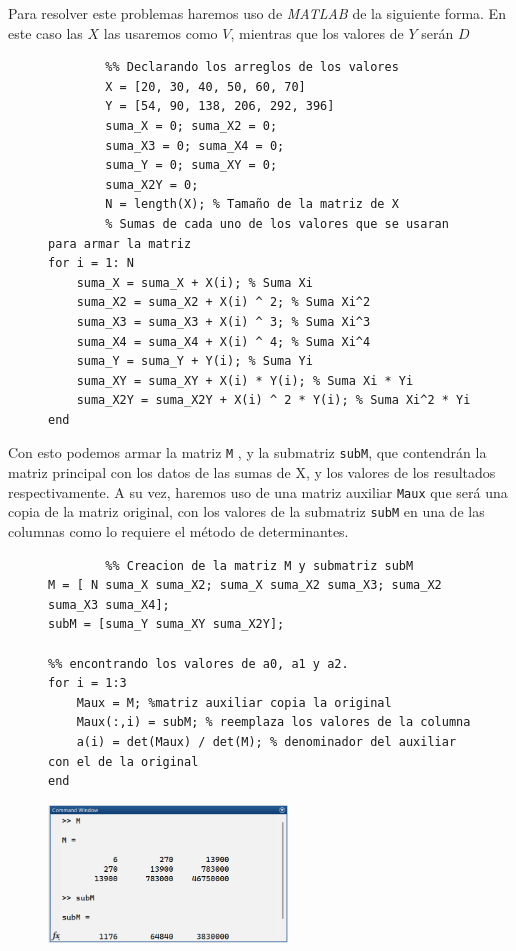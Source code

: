 \documentclass[11pt,letterpaper]{article}
\begin{document}
Para resolver este problemas haremos uso de \emph{MATLAB} de la siguiente forma. En este caso las $X$ las usaremos como $V$, mientras que los valores de $Y$ serán $D$
\begin{figure}[H]
\begin{tcolorbox}[title=Problema 4: Implementación en MATLAB]
	\begin{verbatim}
		%% Declarando los arreglos de los valores
		X = [20, 30, 40, 50, 60, 70]
		Y = [54, 90, 138, 206, 292, 396]
		suma_X = 0; suma_X2 = 0;
		suma_X3 = 0; suma_X4 = 0;
		suma_Y = 0; suma_XY = 0;
		suma_X2Y = 0;
		N = length(X); % Tamaño de la matriz de X
		% Sumas de cada uno de los valores que se usaran para armar la matriz 
for i = 1: N
    suma_X = suma_X + X(i); % Suma Xi
    suma_X2 = suma_X2 + X(i) ^ 2; % Suma Xi^2
    suma_X3 = suma_X3 + X(i) ^ 3; % Suma Xi^3
    suma_X4 = suma_X4 + X(i) ^ 4; % Suma Xi^4
    suma_Y = suma_Y + Y(i); % Suma Yi
    suma_XY = suma_XY + X(i) * Y(i); % Suma Xi * Yi
    suma_X2Y = suma_X2Y + X(i) ^ 2 * Y(i); % Suma Xi^2 * Yi
end
\end{verbatim}
\end{tcolorbox}
\end{figure}
Con esto podemos armar la matriz  \texttt{M} , y la submatriz \texttt{subM}, que contendrán la matriz principal con los datos de las sumas de X, y los valores de los resultados respectivamente. A su vez, haremos uso de una matriz auxiliar \texttt{Maux} que será una copia de la matriz original, con los valores de la submatriz \texttt{subM} en una de las columnas como lo requiere el método de determinantes.
\begin{figure}[H]
\begin{tcolorbox}[breakable, title=Problema 4: Implementación en MATLAB]
		\begin{verbatim}
		%% Creacion de la matriz M y submatriz subM
M = [ N suma_X suma_X2; suma_X suma_X2 suma_X3; suma_X2 suma_X3 suma_X4];
subM = [suma_Y suma_XY suma_X2Y];

%% encontrando los valores de a0, a1 y a2.
for i = 1:3
    Maux = M; %matriz auxiliar copia la original
    Maux(:,i) = subM; % reemplaza los valores de la columna
    a(i) = det(Maux) / det(M); % denominador del auxiliar con el de la original
end
		\end{verbatim}
		\end{tcolorbox}
		\centering
		\includegraphics[width=2.5in]{mtz4.png}

\end{figure}
\end{document}
